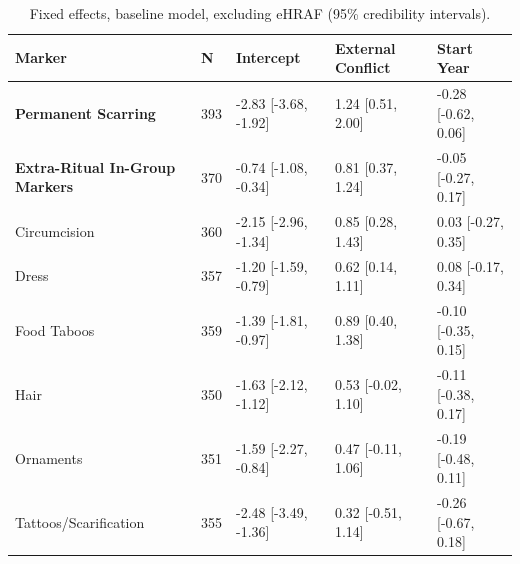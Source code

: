 \begin{table}[!ht]
\centering
\small
\caption{Fixed effects, baseline model, excluding eHRAF (95\% credibility intervals).}
\label{tab:extnoehraf_fixed_effects_baseline}
\begin{tabular}{p{4cm}llll}
\toprule
Marker & N & Intercept & External Conflict & Start Year \\
\midrule
\textbf{Permanent Scarring} & 393 & -2.83 [-3.68, -1.92] & 1.24 [0.51, 2.00] & -0.28 [-0.62, 0.06] \\
\textbf{Extra-Ritual In-Group Markers} & 370 & -0.74 [-1.08, -0.34] & 0.81 [0.37, 1.24] & -0.05 [-0.27, 0.17] \\
\midrule
Circumcision & 360 & -2.15 [-2.96, -1.34] & 0.85 [0.28, 1.43] & 0.03 [-0.27, 0.35] \\
Dress & 357 & -1.20 [-1.59, -0.79] & 0.62 [0.14, 1.11] & 0.08 [-0.17, 0.34] \\
Food Taboos & 359 & -1.39 [-1.81, -0.97] & 0.89 [0.40, 1.38] & -0.10 [-0.35, 0.15] \\
Hair & 350 & -1.63 [-2.12, -1.12] & 0.53 [-0.02, 1.10] & -0.11 [-0.38, 0.17] \\
Ornaments & 351 & -1.59 [-2.27, -0.84] & 0.47 [-0.11, 1.06] & -0.19 [-0.48, 0.11] \\
Tattoos/Scarification & 355 & -2.48 [-3.49, -1.36] & 0.32 [-0.51, 1.14] & -0.26 [-0.67, 0.18] \\
\bottomrule
\end{tabular}
\end{table}